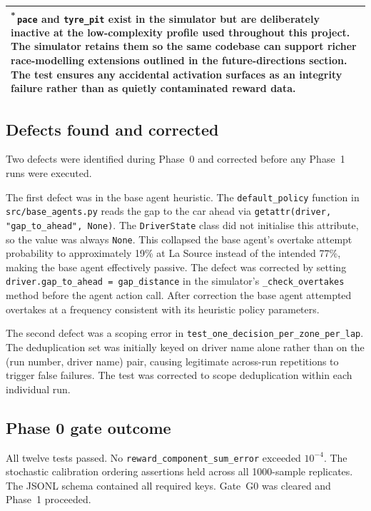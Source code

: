 \begin{appendices}
\begin{table}[htbp]
{\begin{tabular}{|p{0.6cm}|p{6.2cm}|p{9.0cm}|p{1.6cm}|}
\hline
\multicolumn{4}{|p{17.4cm}|}{\textsuperscript{*}\,\texttt{pace} and \texttt{tyre\_pit} exist in the simulator but are deliberately inactive at the low-complexity profile used throughout this project. The simulator retains them so the same codebase can support richer race-modelling extensions outlined in the future-directions section. The test ensures any accidental activation surfaces as an integrity failure rather than as quietly contaminated reward data.} \\
\hline
\end{tabular}
}
\end{table}

\subsection{Defects found and corrected}

Two defects were identified during Phase~0 and corrected before any Phase~1 runs were executed.

The first defect was in the base agent heuristic. The \texttt{default\_policy} function in \texttt{src/base\_agents.py} reads the gap to the car ahead via \texttt{getattr(driver, "gap\_to\_ahead", None)}. The \texttt{DriverState} class did not initialise this attribute, so the value was always \texttt{None}. This collapsed the base agent's overtake attempt probability to approximately 19\% at La Source instead of the intended 77\%, making the base agent effectively passive. The defect was corrected by setting \texttt{driver.gap\_to\_ahead = gap\_distance} in the simulator's \texttt{\_check\_overtakes} method before the agent action call. After correction the base agent attempted overtakes at a frequency consistent with its heuristic policy parameters.

The second defect was a scoping error in \texttt{test\_one\_decision\_per\_zone\_per\_lap}. The deduplication set was initially keyed on driver name alone rather than on the (run number, driver name) pair, causing legitimate across-run repetitions to trigger false failures. The test was corrected to scope deduplication within each individual run.

\subsection{Phase 0 gate outcome}

All twelve tests passed. No \texttt{reward\_component\_sum\_error} exceeded $10^{-4}$. The stochastic calibration ordering assertions held across all 1000-sample replicates. The JSONL schema contained all required keys. Gate~G0 was cleared and Phase~1 proceeded.


\end{appendices}

